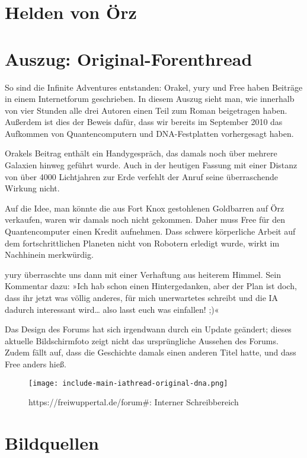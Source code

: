 \chapter{Helden von Örz}


\chapter{Auszug: Original-Forenthread}

So sind die Infinite Adventures entstanden: Orakel, yury und Free haben Beiträge in einem Internetforum geschrieben. In diesem Auszug sieht man, wie innerhalb von vier Stunden alle drei Autoren einen Teil zum Roman beigetragen haben. Außerdem ist dies der Beweis dafür, dass wir bereits im September 2010 das Aufkommen von Quantencomputern und DNA-Festplatten vorhergesagt haben.

Orakels Beitrag enthält ein Handygespräch, das damals noch über mehrere Galaxien hinweg geführt wurde. Auch in der heutigen Fassung mit einer Distanz von über 4000 Lichtjahren zur Erde verfehlt der Anruf seine überraschende Wirkung nicht.

Auf die Idee, man könnte die aus Fort Knox gestohlenen Goldbarren auf Örz verkaufen, waren wir damals noch nicht gekommen. Daher muss Free für den Quantencomputer einen Kredit aufnehmen. Dass schwere körperliche Arbeit auf dem fortschrittlichen Planeten nicht von Robotern erledigt wurde, wirkt im Nachhinein merkwürdig.

yury überraschte uns dann mit einer Verhaftung aus heiterem Himmel. Sein Kommentar dazu: »Ich hab schon einen Hintergedanken, aber der Plan ist doch, dass ihr jetzt was völlig anderes, für mich unerwartetes schreibt und die IA dadurch interessant wird… also lasst euch was einfallen! ;)«

Das Design des Forums hat sich irgendwann durch ein Update geändert; dieses aktuelle Bildschirmfoto zeigt nicht das ursprüngliche Aussehen des Forums. Zudem fällt auf, dass die Geschichte damals einen anderen Titel hatte, und dass Free anders hieß.

\begin{figure}[p]
	\texttt{[image: include-main-iathread-original-dna.png]}
	\caption{https://freiwuppertal.de/forum\#: Interner Schreibbereich}
\end{figure}


\chapter{Bildquellen}

